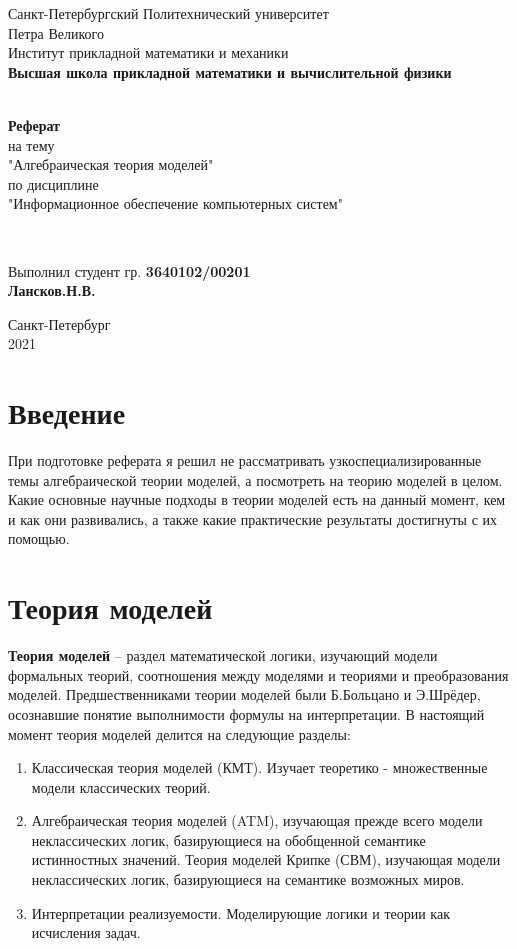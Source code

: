 \documentclass[12pt, a4paper]{article}
\begin{document}
\begin{titlepage}
	\center
		Санкт-Петербургский Политехнический
		университет \\ Петра Великого\\
		Институт прикладной математики и механики
		\\ \textbf{Высшая школа прикладной математики и вычислительной физики}

	\vfill ~
	\textbf{
		\\ \large Реферат
	}
	\\	на тему
	\\ "Алгебраическая теория моделей"
	\\ по дисциплине
	\\ "Информационное обеспечение компьютерных систем"

	\vfill ~

	Выполнил студент гр. \textbf{3640102/00201} \\
	\textbf{Лансков.Н.В.} \\

\vfill

{\large}	Санкт-Петербург
\\ 2021
\end{titlepage}

\section{Введение}

При подготовке реферата я решил не рассматривать узкоспециализированные темы алгебраической теории моделей,
а посмотреть на теорию моделей в целом. Какие основные научные подходы в теории моделей есть на данный момент,
кем и как они развивались, а также какие практические результаты достигнуты с их помощью.

\section{Теория моделей}

\textbf{Теория моделей} – раздел математической логики, изучающий модели формальных теорий,
соотношения между моделями и теориями и преобразования моделей. Предшественниками теории
моделей были Б.Больцано и Э.Шрёдер, осознавшие понятие выполнимости формулы на
интерпретации. В настоящий момент теория моделей делится на следующие разделы: 

\begin{enumerate}
    \item Классическая теория моделей (КМТ). Изучает теоретико - множественные модели классических теорий.
    \item Алгебраическая теория моделей (ATM), изучающая прежде всего модели неклассических логик,
базирующиеся на обобщенной семантике истинностных значений. Теория моделей Крипке (СВМ),
изучающая модели неклассических логик, базирующиеся на семантике возможных миров.
    \item Интерпретации реализуемости. Моделирующие логики и теории как исчисления задач.
\end{enumerate}
\end{document}
